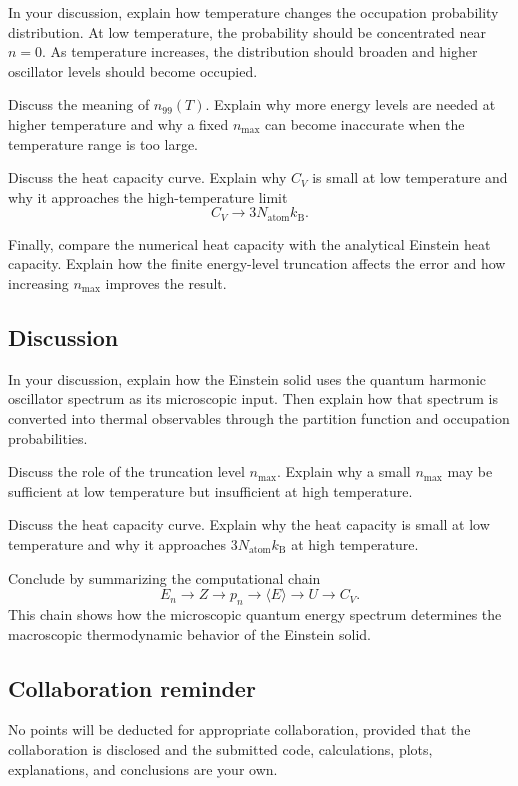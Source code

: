 In your discussion, explain how temperature changes the occupation probability distribution. At low temperature, the probability should be concentrated near \(n=0\). As temperature increases, the distribution should broaden and higher oscillator levels should become occupied.

Discuss the meaning of \(n_{99}(T)\). Explain why more energy levels are needed at higher temperature and why a fixed \(n_{\max}\) can become inaccurate when the temperature range is too large.

Discuss the heat capacity curve. Explain why \(C_V\) is small at low temperature and why it approaches the high-temperature limit
\[
C_V\rightarrow3N_{\mathrm{atom}}k_{\mathrm B}.
\]

Finally, compare the numerical heat capacity with the analytical Einstein heat capacity. Explain how the finite energy-level truncation affects the error and how increasing \(n_{\max}\) improves the result.

\subsection{Discussion}

In your discussion, explain how the Einstein solid uses the quantum harmonic oscillator spectrum as its microscopic input. Then explain how that spectrum is converted into thermal observables through the partition function and occupation probabilities.

Discuss the role of the truncation level \(n_{\max}\). Explain why a small \(n_{\max}\) may be sufficient at low temperature but insufficient at high temperature.

Discuss the heat capacity curve. Explain why the heat capacity is small at low temperature and why it approaches \(3N_{\mathrm{atom}}k_{\mathrm B}\) at high temperature.

Conclude by summarizing the computational chain
\[
E_n
\longrightarrow
Z
\longrightarrow
p_n
\longrightarrow
\langle E\rangle
\longrightarrow
U
\longrightarrow
C_V.
\]
This chain shows how the microscopic quantum energy spectrum determines the macroscopic thermodynamic behavior of the Einstein solid.

\subsection{Collaboration reminder}

No points will be deducted for appropriate collaboration, provided that the collaboration is disclosed and the submitted code, calculations, plots, explanations, and conclusions are your own.